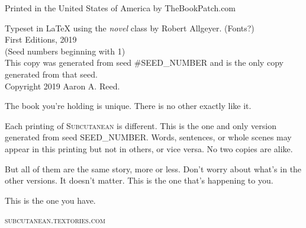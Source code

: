 \thispagestyle{empty}

\NewFontFamily{}
\vspace*{6\nbs}
\begin{center}
{\mont {}}
\end{center}
\clearpage

\thispagestyle{empty}
\null %
\clearpage

\thispagestyle{empty}
\vspace*{6\nbs}
\begin{center}
{\mont {}}

\vspace*{3\nbs}

{\mont {}}

\vfill
Printed in the United States of America by TheBookPatch.com

\end{center}
\clearpage

\thispagestyle{empty}
\null\vfill

\begin{legalese}
Typeset in LaTeX using the \textit{novel} class by Robert Allgeyer. (Fonts?) \\
\vspace{1\nbs}
First Editions, 2019 \\
(Seed numbers beginning with 1) \\
This copy was generated from seed #SEED_NUMBER and is the only copy generated from that seed. \\
Copyright 2019 Aaron A. Reed.
\end{legalese}
\clearpage

\thispagestyle{empty}

\vspace*{10\nbs}

\begin{adjustwidth}{4em}{4em}
\begin{parascale}[0.88]
The book you're holding is unique. There is no other exactly like it.

Each printing of \textsc{Subcutanean} is different. This is the one and only version generated from seed SEED_NUMBER. Words, sentences, or whole scenes may appear in this printing but not in others, or vice versa. No two copies are alike.

But all of them are the same story, more or less. Don't worry about what's in the other versions. It doesn't matter. This is the one that's happening to you.

This is the one you have.  
\end{parascale}
\end{adjustwidth}

\vspace*{2\nbs}

\begin{center}
\textsc{subcutanean.textories.com}
\end{center}

\clearpage



